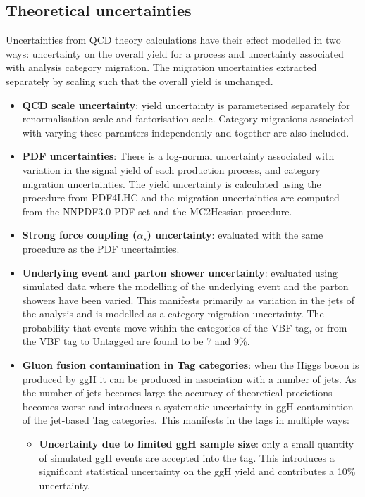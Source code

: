 \subsection{Theoretical uncertainties}
Uncertainties from QCD theory calculations have their effect modelled in two ways: uncertainty on the overall yield for a process and uncertainty associated with analysis category migration. 
The migration uncertainties extracted separately by scaling such that the overall yield is unchanged.  
\begin{itemize}[noitemsep]
    \item {\textbf{QCD scale uncertainty}: yield uncertainty is parameterised separately for renormalisation scale and factorisation scale. 
                                            Category migrations associated with varying these paramters independently and together are also included.}
    \item{\textbf{PDF uncertainties}: There is a log-normal uncertainty associated with variation in the signal yield of each production process, and category migration uncertainties.   
                                     The yield uncertainty is calculated using the procedure from PDF4LHC and the migration uncertainties are computed from the NNPDF3.0 PDF set and the MC2Hessian procedure.}
    \item{\textbf{Strong force coupling ($\alpha_{s}$) uncertainty}: evaluated with the same procedure as the PDF uncertainties.}
    \item{\textbf{Underlying event and parton shower uncertainty}: evaluated using simulated data where the modelling of the underlying event and the parton showers have been varied. This manifests primarily as variation in the jets of the analysis and is modelled as a category migration uncertainty. The probability that events move within the categories of the VBF tag, or from the VBF tag to Untagged are found to be 7 and 9\%.}
    \item{\textbf{Gluon fusion contamination in \ttH Tag categories}: when the Higgs boson is produced by ggH it can be produced in association with a number of jets. As the number of jets becomes large the accuracy of theoretical precictions becomes worse and introduces a systematic uncertainty in ggH contamintion of the jet-based Tag categories. This manifests in the \ttH tags in multiple ways:
        \begin{itemize}[noitemsep]
            \item[\textbullet] \textbf{Uncertainty due to limited ggH sample size}: only a small quantity of simulated ggH events are accepted into the \ttH tag. This introduces a significant statistical uncertainty on the ggH yield and contributes a 10\% uncertainty.

\end{itemize}}
\end{itemize}
